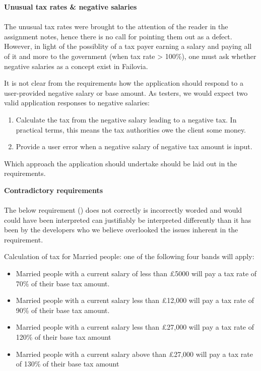 \textbf{Unusual tax rates \& negative salaries \\}
\\
The unusual tax rates were brought to the attention of the reader in the assignment notes, hence there is no call for pointing them out as a defect. However, in light of the possiblity of a tax payer earning a salary and paying all of it and more to the government (when tax rate > 100\%), one must ask whether negative salaries as a concept exist in Failovia. 
\par
It is not clear from the requirements how the application should respond to a user-provided negative salary or base amount. As testers, we would expect two valid application responses to negative salaries: 

\begin{enumerate}
	\item Calculate the tax from the negative salary leading to a negative tax. In practical terms, this means the tax authorities owe the client some money.
	\item Provide a user error when a negative salary of negative tax amount is input. 
\end{enumerate}

Which approach the application should undertake should be laid out in the requirements.

\textbf{Contradictory requirements\\}
\\
The below requirement (\REightFive) does not correctly  is incorrectly worded and would could have been interpreted  can justifiably be interpreted differently than it has been by the developers who we believe overlooked the issues inherent in the requirement. 
\par
Calculation of tax for Married people: one of the following four bands will apply:
\begin{itemize}[noitemsep]
	\item Married people with a current salary of less than £5000 will pay a tax rate of
	70\% of their base tax amount.
	\item Married people with a current salary less than £12,000 will pay a tax rate of
	90\% of their base tax amount.
	\item Married people with a current salary less than £27,000 will pay a tax rate of
	120\% of their base tax amount
	\item Married people with a current salary above than £27,000 will pay a tax rate
	of 130\% of their base tax amount
\end{itemize}	

